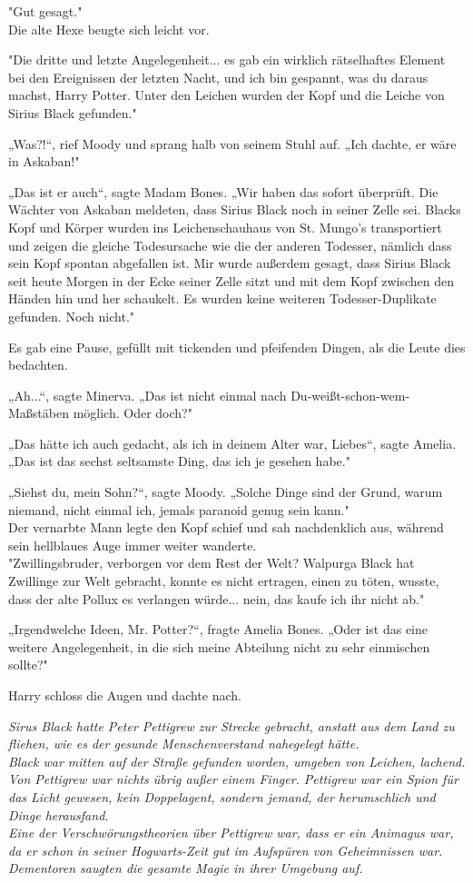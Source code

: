 {"Gut gesagt."\\ Die alte Hexe beugte sich leicht vor.

"Die dritte und letzte Angelegenheit... es gab ein wirklich rätselhaftes Element bei den Ereignissen der letzten Nacht, und ich bin gespannt, was du daraus machst, Harry Potter. Unter den Leichen wurden der Kopf und die Leiche von Sirius Black gefunden."

„Was?!“, rief Moody und sprang halb von seinem Stuhl auf. „Ich dachte, er wäre in Askaban!"

„Das ist er auch“, sagte Madam Bones. „Wir haben das sofort überprüft. Die Wächter von Askaban meldeten, dass Sirius Black noch in seiner Zelle sei. Blacks Kopf und Körper wurden ins Leichenschauhaus von St. Mungo's transportiert und zeigen die gleiche Todesursache wie die der anderen Todesser, nämlich dass sein Kopf spontan abgefallen ist. Mir wurde außerdem gesagt, dass Sirius Black seit heute Morgen in der Ecke seiner Zelle sitzt und mit dem Kopf zwischen den Händen hin und her schaukelt. Es wurden keine weiteren Todesser-Duplikate gefunden. Noch nicht."

Es gab eine Pause, gefüllt mit tickenden und pfeifenden Dingen, als die Leute dies bedachten.

„Ah...“, sagte Minerva. „Das ist nicht einmal nach Du-weißt-schon-wem-Maßstäben möglich. Oder doch?"

„Das hätte ich auch gedacht, als ich in deinem Alter war, Liebes“, sagte Amelia. „Das ist das sechst seltsamste Ding, das ich je gesehen habe."

„Siehst du, mein Sohn?“, sagte Moody. „Solche Dinge sind der Grund, warum niemand, nicht einmal ich, jemals paranoid genug sein kann."\\ Der vernarbte Mann legte den Kopf schief und sah nachdenklich aus, während sein hellblaues Auge immer weiter wanderte.\\ "Zwillingsbruder, verborgen vor dem Rest der Welt? Walpurga Black hat Zwillinge zur Welt gebracht, konnte es nicht ertragen, einen zu töten, wusste, dass der alte Pollux es verlangen würde... nein, das kaufe ich ihr nicht ab."

„Irgendwelche Ideen, Mr. Potter?“, fragte Amelia Bones. „Oder ist das eine weitere Angelegenheit, in die sich meine Abteilung nicht zu sehr einmischen sollte?"

Harry schloss die Augen und dachte nach.

\emph{Sirus Black hatte Peter Pettigrew zur Strecke gebracht, anstatt aus dem Land zu fliehen, wie es der gesunde Menschenverstand nahegelegt hätte.\\ Black war mitten auf der Straße gefunden worden, umgeben von Leichen, lachend. Von Pettigrew war nichts übrig außer einem Finger. Pettigrew war ein Spion für das Licht gewesen, kein Doppelagent, sondern jemand, der herumschlich und Dinge herausfand.}\\ \emph{\hfill\break Eine der Verschwörungstheorien über Pettigrew war, dass er ein Animagus war, da er schon in seiner Hogwarts-Zeit gut im Aufspüren von Geheimnissen war.}\\ \emph{\hfill\break Dementoren saugten die gesamte Magie in ihrer Umgebung auf.}

}
